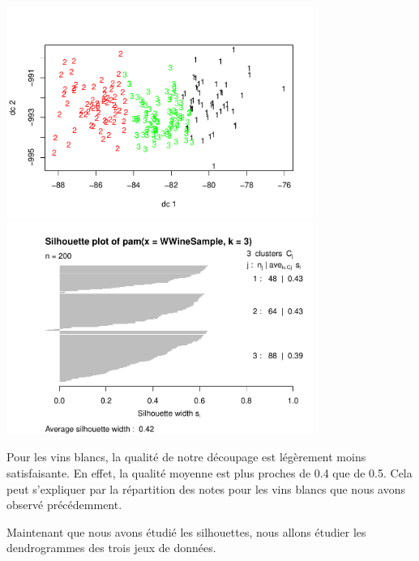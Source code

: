 \documentclass[
]{article}
\begin{document}
\begin{center}
	\includegraphics[width=10cm]{repport_files/figure-latex/unnamed-chunk-14-1.pdf}
	\includegraphics[width=10cm]{repport_files/figure-latex/unnamed-chunk-14-2.pdf}
\end{center}

Pour les vins blancs, la qualité de notre découpage est légèrement moins
satisfaisante. En effet, la qualité moyenne est plus proches
de 0.4 que de 0.5. Cela peut s'expliquer par la répartition des notes
pour les vins blancs que nous avons observé précédemment.

Maintenant que nous avons étudié les silhouettes, nous allons étudier
les dendrogrammes des trois jeux de données.
\end{document}
